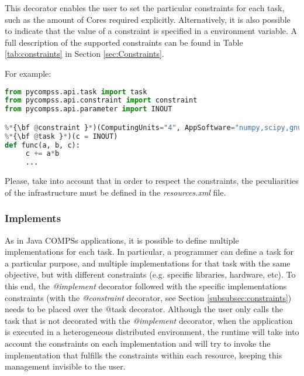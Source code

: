 This decorator enables the user to set the particular constraints for each task, such as the amount of Cores required explicitly.
Alternatively, it is also possible to indicate that the value of a constraint is specified in a environment variable.
A full description of the supported constraints can be found in Table \ref{tab:constraints} in Section \ref{sec:Constraints}.

For example:

\begin{lstlisting}[language=python]
from pycompss.api.task import task
from pycompss.api.constraint import constraint
from pycompss.api.parameter import INOUT

%*{\bf @constraint }*)(ComputingUnits="4", AppSoftware="numpy,scipy,gnuplot", memorySize="$MIN_MEM_REQ")
%*{\bf @task }*)(c = INOUT)
def func(a, b, c):
     c += a*b
     ...
\end{lstlisting}

Please, take into account that in order to respect the constraints, the peculiarities of the infrastructure must be defined in the {\it resources.xml} file.


\subsubsection{Implements}

As in Java COMPSs applications, it is possible to define multiple implementations for each task.
In particular, a programmer can define a task for a particular purpose, and multiple implementations for that task
with the same objective, but with different constraints (e.g. specific libraries, hardware, etc). 
To this end, the {\it @implement} decorator followed with the specific implementations constraints (with the 
{\it @constraint} decorator, see Section \ref{subsubsec:constraints}) needs to be placed over the $@$task decorator.
Although the user only calls the task that is not decorated with the {\it @implement} decorator, when the application 
is executed in a heterogeneous distributed environment, the runtime will take into account the constraints on each 
implementation  and will try to invoke the implementation that fulfills the constraints within each resource, 
keeping this management invisible to the user.


